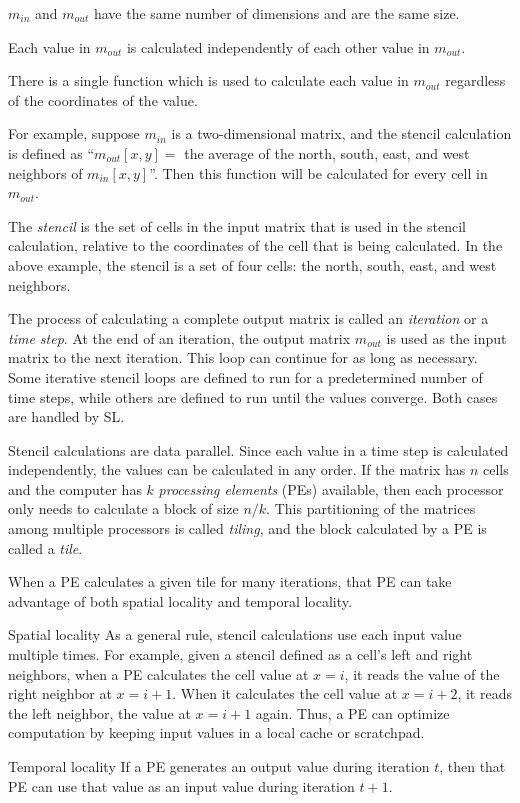 \documentclass{sig-alternate}
\begin{document}
\begin{enumerate*}
\item $m_{in}$ and $m_{out}$ have the same number of dimensions and are the
  same size.
\item Each value in $m_{out}$ is calculated independently of each other value
  in $m_{out}$.
\item There is a single function which is used to calculate each value in
  $m_{out}$ regardless of the coordinates of the value.
\end{enumerate*}

For example, suppose $m_{in}$ is a two-dimensional matrix, and the stencil
calculation is defined as ``$m_{out}[x, y] =$ the average of the north,
south, east, and west neighbors of $m_{in}[x, y]$''.  Then this function will
be calculated for every cell in $m_{out}$.

The {\em stencil} is the set of cells in the input matrix that is used in the
stencil calculation, relative to the coordinates of the cell that is being
calculated.  In the above example, the stencil is a set of four cells: the
north, south, east, and west neighbors.

The process of calculating a complete output matrix is called an {\em
  iteration} or a {\em time step}.  At the end of an iteration, the output
matrix $m_{out}$ is used as the input matrix to the next iteration.  This
loop can continue for as long as necessary.  Some iterative stencil loops are
defined to run for a predetermined number of time steps, while others are
defined to run until the values converge.  Both cases are handled by SL.

Stencil calculations are data parallel.  Since each value in a time step is
calculated independently, the values can be calculated in any order.  If the
matrix has $n$ cells and the computer has $k$ {\em processing elements} (PEs)
available, then each processor only needs to calculate a block of size $n/k$.
This partitioning of the matrices among multiple processors is called {\em
  tiling}, and the block calculated by a PE is called a {\em tile}.

When a PE calculates a given tile for many iterations, that PE can take
advantage of both spatial locality and temporal locality.
\begin{description*}
\item[Spatial locality] As a general rule, stencil calculations use each
  input value multiple times.  For example, given a stencil defined as a
  cell's left and right neighbors, when a PE calculates the cell value at
  $x=i$, it reads the value of the right neighbor at $x=i+1$.  When it
  calculates the cell value at $x=i+2$, it reads the left neighbor, the value
  at $x=i+1$ again.  Thus, a PE can optimize computation by keeping input
  values in a local cache or scratchpad.
\item[Temporal locality] If a PE generates an output value during
  iteration $t$, then that PE can use that value as an input value during
  iteration $t+1$.
\end{description*}
\end{document}
